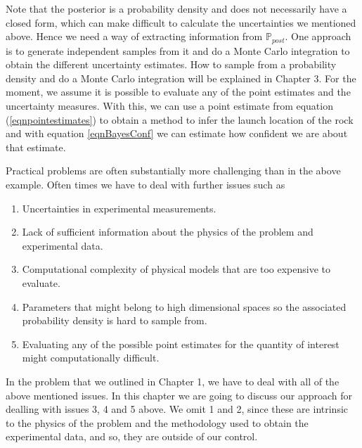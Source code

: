 \documentclass[12pt]{book}
\newcommand{\post}{\mathbb{P}_{post}}
\begin{document}
Note that the posterior is a probability density and  does not necessarily have a closed form, which
can make  difficult to calculate the uncertainties we mentioned above.
Hence we need a way of extracting information from $\post$. One approach is to generate 
independent samples
from it and do a Monte Carlo integration   to obtain the different uncertainty estimates. 
How to sample from a probability 
density and do a Monte Carlo integration will be explained in Chapter 3. For the moment, we
assume it is possible to evaluate any of the point estimates and the uncertainty measures. With 
this, we can use a point estimate from equation (\ref{eqnpointestimates}) to obtain a method to infer 
the launch location of the rock and with equation \eqref{eqnBayesConf} we can estimate how confident we are
about that estimate. 
\newline


Practical problems are often substantially more challenging than in the above example. Often times we have to 
deal with further issues such as 

\begin{enumerate}
\item Uncertainties in experimental measurements.
\item Lack of sufficient information about the physics of the problem and experimental data.
\item Computational complexity of  physical models that are too expensive to evaluate.
\item Parameters that might belong to high dimensional spaces so the associated probability density is 
hard to sample from.
\item Evaluating any of the possible point estimates for the quantity of interest might computationally difficult.
\end{enumerate}
In the problem that we outlined in  Chapter 1, we have to deal with all of  the above mentioned issues.
In this chapter we are going to discuss our approach for dealling with issues 3, 4 and 5 above. We 
omit 1 and 2, since these  are intrinsic to the physics of the problem and   the methodology used 
to obtain the experimental data, and so, they are outside of our control.


\end{document}

